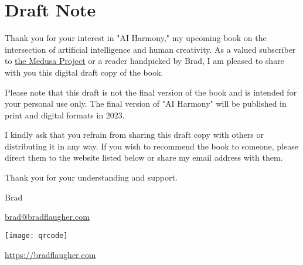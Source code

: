 \let\cleardoublepage\clearpage
\chapter{Draft Note}

Thank you for your interest in "AI Harmony," my upcoming book on the intersection of artificial intelligence and human creativity. As a valued subscriber to \href{https://www.patreon.com/bradflaugher}{the Medusa Project} or a reader handpicked by Brad, I am pleased to share with you this digital draft copy of the book.

Please note that this draft is not the final version of the book and is intended for your personal use only. The final version of "AI Harmony" will be published in print and digital formats in 2023.

I kindly ask that you refrain from sharing this draft copy with others or distributing it in any way. If you wish to recommend the book to someone, please direct them to the website listed below or share my email address with them.

Thank you for your understanding and support.

Brad

\href{mailto:brad@bradflaugher.com}{brad@bradflaugher.com}

\vfill

\texttt{[image: qrcode]}

\url{https://bradflaugher.com}
